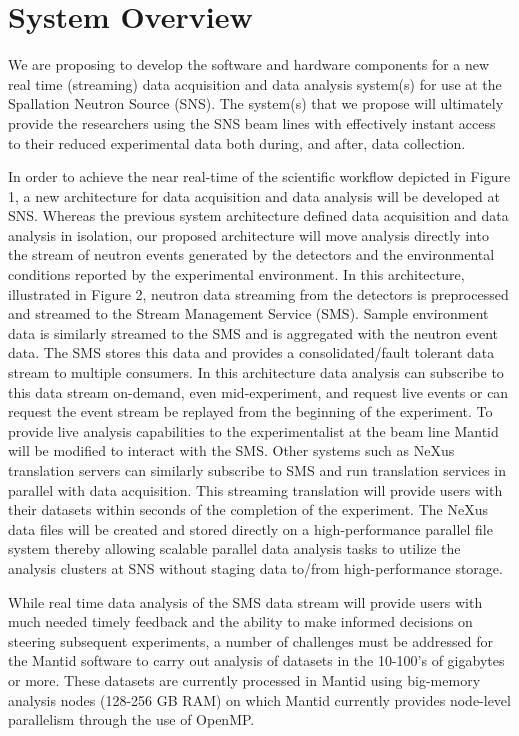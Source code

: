 \section{System Overview}

We are proposing to develop the software and hardware components for a
new real time (streaming) data acquisition and data analysis system(s)
for use at the Spallation Neutron Source (SNS). The system(s) that we
propose will ultimately provide the researchers using the SNS beam
lines with effectively instant access to their reduced experimental
data both during, and after, data collection.


In order to achieve the near real-time of the scientific workflow
depicted in Figure 1, a new architecture for data acquisition and data
analysis will be developed at SNS. Whereas the previous system
architecture defined data acquisition and data analysis in isolation,
our proposed architecture will move analysis directly into the stream
of neutron events generated by the detectors and the environmental
conditions reported by the experimental environment. In this
architecture, illustrated in Figure 2, neutron data streaming from the
detectors is preprocessed and streamed to the Stream Management
Service (SMS). Sample environment data is similarly streamed to the
SMS and is aggregated with the neutron event data. The SMS stores this
data and provides a consolidated/fault tolerant data stream to
multiple consumers. In this architecture data analysis can subscribe
to this data stream on-demand, even mid-experiment, and request live
events or can request the event stream be replayed from the beginning
of the experiment. To provide live analysis capabilities to the
experimentalist at the beam line Mantid will be modified to interact
with the SMS. Other systems such as NeXus translation servers can
similarly subscribe to SMS and run translation services in parallel
with data acquisition. This streaming translation will provide users
with their datasets within seconds of the completion of the
experiment. The NeXus data files will be created and stored directly
on a high-performance parallel file system thereby allowing scalable
parallel data analysis tasks to utilize the analysis clusters at SNS
without staging data to/from high-performance storage. 



While real time data analysis of the SMS data stream will provide
users with much needed timely feedback and the ability to make
informed decisions on steering subsequent experiments, a number of
challenges must be addressed for the Mantid software to carry out
analysis of datasets in the 10-100’s of gigabytes or more. These
datasets are currently processed in Mantid using big-memory analysis
nodes (128-256 GB RAM) on which Mantid currently provides node-level
parallelism through the use of OpenMP.

